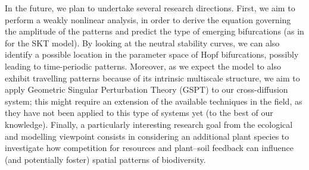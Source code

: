 \documentclass[11pt]{elsarticle}
\theoremstyle{plain}
\theoremstyle{definition}
\theoremstyle{myremark}
\begin{document}
In the future, we plan to undertake several research directions. First, we aim to perform a weakly nonlinear analysis, in order to derive the equation governing the amplitude of the patterns and predict the type of emerging bifurcations (as in \cite{solopaper} for the SKT model). By looking at the neutral stability curves, we can also identify a possible location in the parameter space of Hopf bifurcations, possibly leading to time-periodic patterns. Moreover, as we expect the model to also exhibit travelling patterns because of its intrinsic multiscale structure, we aim to apply Geometric Singular Perturbation Theory (GSPT) to our cross-diffusion system; this might require an extension of the available techniques in the field, as they have not been applied to this type of systems yet (to the best of our knowledge). 
Finally, a particularly interesting research goal from the ecological and modelling viewpoint consists in considering an additional plant species to investigate how competition for resources and plant--soil feedback can influence (and potentially foster) spatial patterns of biodiversity.



\end{document}
